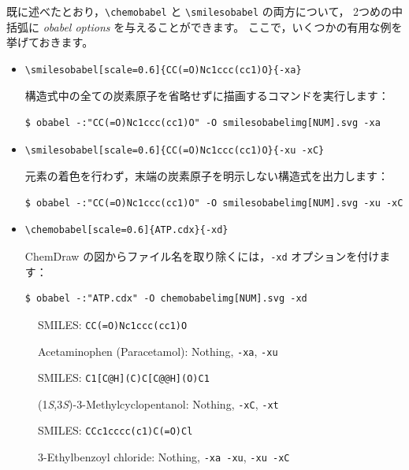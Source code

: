 \documentclass[12pt]{ltjsarticle}
\begin{document}
既に述べたとおり，\verb|\chemobabel| と \verb|\smilesobabel| の両方について，
2つめの中括弧に \textit{obabel options} を与えることができます。
ここで，いくつかの有用な例を挙げておきます。
\begin{itemize}
\item
\begin{verbatim}
\smilesobabel[scale=0.6]{CC(=O)Nc1ccc(cc1)O}{-xa}
\end{verbatim}
構造式中の全ての炭素原子を省略せずに描画するコマンドを実行します：
\begin{verbatim}
$ obabel -:"CC(=O)Nc1ccc(cc1)O" -O smilesobabelimg[NUM].svg -xa
\end{verbatim}
\item
\begin{verbatim}
\smilesobabel[scale=0.6]{CC(=O)Nc1ccc(cc1)O}{-xu -xC}
\end{verbatim}
元素の着色を行わず，末端の炭素原子を明示しない構造式を出力します：
\begin{verbatim}
$ obabel -:"CC(=O)Nc1ccc(cc1)O" -O smilesobabelimg[NUM].svg -xu -xC
\end{verbatim}
\item
\begin{verbatim}
\chemobabel[scale=0.6]{ATP.cdx}{-xd}
\end{verbatim}
ChemDraw の図からファイル名を取り除くには，\texttt{-xd} オプションを付けます：
\begin{verbatim}
$ obabel -:"ATP.cdx" -O chemobabelimg[NUM].svg -xd
\end{verbatim}
\end{itemize}

\begin{figure}[ht]
  \centering
  \caption{Acetaminophen (Paracetamol): Nothing, \texttt{-xa}, \texttt{-xu}}
  SMILES: \verb|CC(=O)Nc1ccc(cc1)O|
\end{figure}

\begin{figure}[ht]
  \centering
  \caption{(1\textit{S},3\textit{S})-3-Methylcyclopentanol: Nothing, \texttt{-xC}, \texttt{-xt}}
  SMILES: \verb|C1[C@H](C)C[C@@H](O)C1|
\end{figure}

\begin{figure}[ht]
  \centering
  \caption{3-Ethylbenzoyl chloride: Nothing, \texttt{-xa -xu}, \texttt{-xu -xC}}
  SMILES: \verb|CCc1cccc(c1)C(=O)Cl|
\end{figure}
\end{document}
